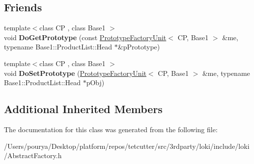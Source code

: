 \subsection*{Friends}
\begin{DoxyCompactItemize}
\item 
\hypertarget{classLoki_1_1PrototypeFactoryUnit_a3c3c430d6c8819b49e2451a3b8010552}{}{\footnotesize template$<$class C\+P , class Base1 $>$ }\\void {\bfseries Do\+Get\+Prototype} (const \hyperlink{classLoki_1_1PrototypeFactoryUnit}{Prototype\+Factory\+Unit}$<$ C\+P, Base1 $>$ \&me, typename Base1\+::\+Product\+List\+::\+Head $\ast$\&p\+Prototype)\label{classLoki_1_1PrototypeFactoryUnit_a3c3c430d6c8819b49e2451a3b8010552}

\item 
\hypertarget{classLoki_1_1PrototypeFactoryUnit_a787468ae53d171d948cae9b35f25f544}{}{\footnotesize template$<$class C\+P , class Base1 $>$ }\\void {\bfseries Do\+Set\+Prototype} (\hyperlink{classLoki_1_1PrototypeFactoryUnit}{Prototype\+Factory\+Unit}$<$ C\+P, Base1 $>$ \&me, typename Base1\+::\+Product\+List\+::\+Head $\ast$p\+Obj)\label{classLoki_1_1PrototypeFactoryUnit_a787468ae53d171d948cae9b35f25f544}

\end{DoxyCompactItemize}
\subsection*{Additional Inherited Members}


The documentation for this class was generated from the following file\+:\begin{DoxyCompactItemize}
\item 
/\+Users/pourya/\+Desktop/platform/repos/tetcutter/src/3rdparty/loki/include/loki/Abstract\+Factory.\+h\end{DoxyCompactItemize}
